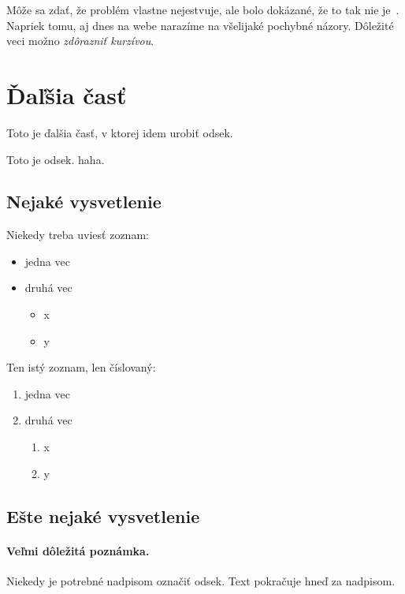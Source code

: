 \documentclass[10pt ,english,a4paper]{article}
\begin{document}
Môže sa zdať, že problém vlastne nejestvuje\cite{Coplien:MPD}, ale bolo dokázané, že to tak nie je~\cite{Czarnecki:Staged, Czarnecki:Progress}. Napriek tomu, aj dnes na webe narazíme na všelijaké pochybné názory\cite{PLP-Framework}. Dôležité veci možno \emph{zdôrazniť kurzívou}.

\section{Ďaľšia časť}
Toto je ďalšia časť, v ktorej idem urobiť odsek.

Toto je odsek. haha.

\subsection{Nejaké vysvetlenie} \label{ina:nejake}

Niekedy treba uviesť zoznam:

\begin{itemize}
\item jedna vec
\item druhá vec
	\begin{itemize}
	\item x
	\item y
	\end{itemize}
\end{itemize}

Ten istý zoznam, len číslovaný:

\begin{enumerate}
\item jedna vec
\item druhá vec
	\begin{enumerate}
	\item x
	\item y
	\end{enumerate}
\end{enumerate}


\subsection{Ešte nejaké vysvetlenie} \label{ina:este}

\paragraph{Veľmi dôležitá poznámka.}
Niekedy je potrebné nadpisom označiť odsek. Text pokračuje hneď za nadpisom.
\end{document}
